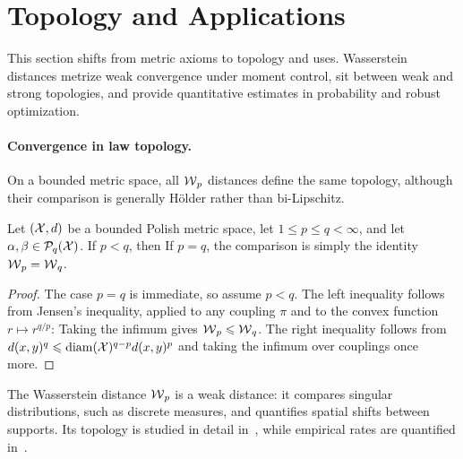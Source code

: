 \section{Topology and Applications}
\label{sec-wasserstein-topology-applications}

This section shifts from metric axioms to topology and uses. Wasserstein distances metrize weak convergence under moment control, sit between weak and strong topologies, and provide quantitative estimates in probability and robust optimization.

\paragraph{Convergence in law topology.}

On a bounded metric space, all $\operatorname{\mathcal{W}}_p$ distances define the same topology, although their comparison is generally H\"older rather than bi-Lipschitz.

\begin{prop}\label{prop-comp-wass-p}
		Let $(\mathcal{X},d)$ be a bounded Polish metric space, let $1\leq p\leq q<\infty$, and let $\alpha,\beta\in\mathcal{P}_q(\mathcal{X})$. If $p<q$, then
		If $p=q$, the comparison is simply the identity $\operatorname{\mathcal{W}}_p=\operatorname{\mathcal{W}}_q$.
\end{prop}
\begin{proof}
			The case $p=q$ is immediate, so assume $p<q$.
			The left inequality follows from Jensen's inequality, applied to any coupling $\pi$ and to the convex function $r\mapsto r^{q/p}$:
			Taking the infimum gives $\operatorname{\mathcal{W}}_p\leqslant\operatorname{\mathcal{W}}_q$. The right inequality follows from
			\(d(x,y)^q \leqslant \operatorname{diam}(\mathcal{X})^{q-p} d(x,y)^p\)
			and taking the infimum over couplings once more.
		\end{proof}

The Wasserstein distance $\operatorname{\mathcal{W}}_p$ is a weak distance: it compares singular distributions, such as discrete measures, and quantifies spatial shifts between supports. Its topology is studied in detail in~\cite{Villani09,SantambrogioBook,gigli2011user}, while empirical rates are quantified in~\cite{dudley1969speed,fournier2015rate,weed2017sharp,boissard2015distribution,bolley2007quantitative}.

